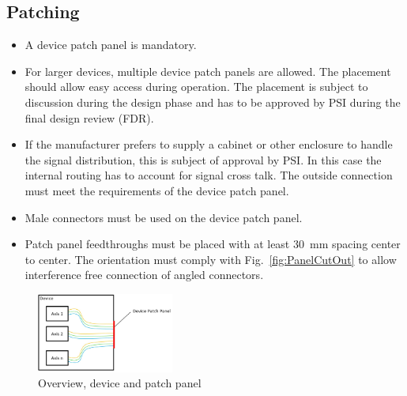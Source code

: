 \documentclass[english]{psi_easy}
\begin{document}
\subsection{Patching}
\begin{itemize}
    \item A device patch panel is mandatory.
    \item For larger devices, multiple device patch panels are allowed.
    The placement should allow easy access during operation. 
    The placement is subject to discussion during the design phase and has to be approved by PSI during the final design review (FDR).
    \item If the manufacturer prefers to supply a cabinet or other enclosure to handle the signal distribution, this is subject of approval by PSI.
            In this case the internal routing has to account for signal cross talk.
            The outside connection must meet the requirements of the device patch panel. 
    \item Male connectors must be used on the device patch panel.
    \item Patch panel feedthroughs must be placed with at least 30~mm spacing center to center.
            The orientation must comply with Fig.~\ref{fig:PanelCutOut} to allow interference free connection of angled connectors.
\end{itemize}

\begin{figure}[H]
\centering
\includegraphics[width=0.4\textwidth]{Figures/DevicePatchPanel.jpg}
\caption{\label{fig:DevicePatchPanel}Overview, device and patch panel}
\end{figure}
\end{document}
